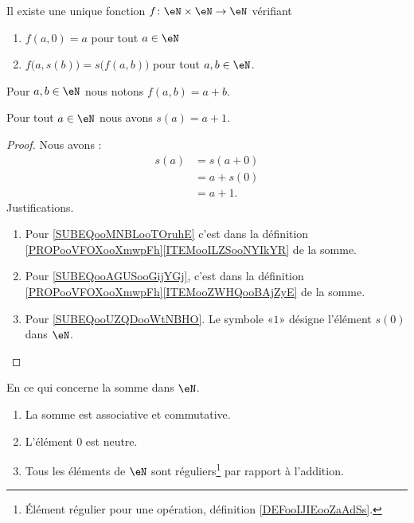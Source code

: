 \begin{propositionDef}      \label{PROPooVFOXooXmwpFh}
    Il existe une unique fonction \( f\colon \eN\times \eN\to \eN\) vérifiant
    \begin{enumerate}
        \item       \label{ITEMooILZSooNYIkYR}
            \( f(a,0)=a\) pour tout \( a\in \eN\)
        \item       \label{ITEMooZWHQooBAjZyE}
            \( f\big( a,s(b) \big)=s\big( f(a,b) \big)\) pour tout \( a,b\in \eN\).
    \end{enumerate}
    Pour \( a,b\in \eN\) nous notons \( f(a,b)=a+b\).
\end{propositionDef}

\begin{lemma}      \label{LEMooMJMTooOtUuJT}
    Pour tout \( a\in \eN\) nous avons \( s(a)=a+1\).
\end{lemma}

\begin{proof}
    Nous avons :
    \begin{subequations}
        \begin{align}
            s(a)&=s(a+0)        \label{SUBEQooMNBLooTOruhE}\\
            &=a+s(0)        \label{SUBEQooAGUSooGijYGj}\\
            &=a+1.          \label{SUBEQooUZQDooWtNBHO}
        \end{align}
    \end{subequations}
    Justifications.
    \begin{enumerate}
        \item
            Pour \eqref{SUBEQooMNBLooTOruhE} c'est dans la définition \ref{PROPooVFOXooXmwpFh}\ref{ITEMooILZSooNYIkYR} de la somme.
        \item
            Pour \eqref{SUBEQooAGUSooGijYGj}, c'est dans la définition \ref{PROPooVFOXooXmwpFh}\ref{ITEMooZWHQooBAjZyE} de la somme.
        \item
            Pour \eqref{SUBEQooUZQDooWtNBHO}. Le symbole «\( 1\)» désigne l'élément \( s(0)\) dans \( \eN\).
    \end{enumerate}
\end{proof}

\begin{proposition}     \label{PROPooTLTSooGNMTmV}
    En ce qui concerne la somme dans \( \eN\).
    \begin{enumerate}
        \item       \label{ITEMooIFFPooXfftfG}
            La somme est associative et commutative.
        \item       \label{ITEMooSGRVooPAVFYK}
            L'élément \( 0\) est neutre.
        \item       \label{ITEMooNUTHooJWWzGv}
            Tous les éléments de \( \eN\) sont réguliers\footnote{Élément régulier pour une opération, définition \ref{DEFooIJIEooZaAdSs}.} par rapport à l'addition.
    \end{enumerate}
\end{proposition}

